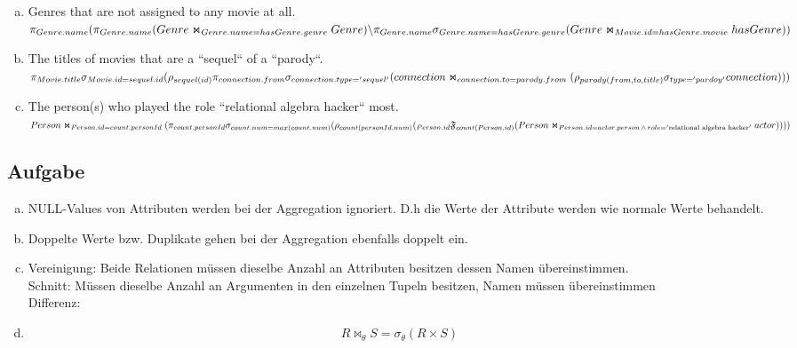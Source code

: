 \documentclass[11pt,a4paper,DIV=9]{scrartcl}
\newcounter{temp}
\newcommand{\aufgabe}[1]{
  \setcounter{temp}{\value{subsection}}
  \setcounter{subsection}{#1}
  \addtocounter{subsection}{-1}
  \subsection{Aufgabe}
  \setcounter{subsection}{\value{temp}}
}
\begin{document}
\begin{enumerate}[a)]
    \item Genres that are not assigned to any movie at all. \hfill \\
      $
      \pi _{Genre.name} \\
      (\pi _{Genre.name}(Genre \Join _{Genre.name = hasGenre.genre} Genre )\\
      \backslash
        \\
        \pi _{Genre.name} \sigma _{Genre.name = hasGenre.genre} (Genre \Join _{Movie.id = hasGenre.movie} hasGenre))
      $
    \item The titles of movies that are a ``sequel`` of a ``parody``. \\
      $\pi_{Movie.title} \\
      \sigma_{Movie.id = sequel.id} \\
      (\rho_{sequel(id)}\\
      \pi_{connection.from}\sigma_{connection.type='sequel'}\\
      (connection \Join_{connection.to = parody.from} \\ 
        (\rho_{parody(from,to,title)}\sigma_{type='pardoy'}connection)\\
      ))$
    \item The person(s) who played the role ``relational algebra hacker`` most.\hfill\\
      $
      Person \Join_{Person.id = count.personId}(\pi_{count.personId}\\
      \sigma_{count.num=max(count.num)}\\
      (
        \rho_{count(personId,num)} (\\
          _{Person.id}\mathfrak{F}_{count(Person.id)}(\\
          Person\Join_{Person.id = actor.person \,\wedge\, role = '\textrm{relational algebra hacker}'}actor\\
          )\\
        )\\
      ))
      $
  \end{enumerate}
\aufgabe{2}
 \begin{enumerate}[a)]
   \item NULL-Values von Attributen werden bei der Aggregation ignoriert. D.h die Werte der Attribute werden wie normale Werte behandelt.
   \item Doppelte Werte bzw. Duplikate gehen bei der Aggregation ebenfalls doppelt ein.
   \item Vereinigung: Beide Relationen m\"ussen dieselbe Anzahl an Attributen besitzen dessen Namen \"ubereinstimmen. 
   \\ Schnitt: M\"ussen dieselbe Anzahl an Argumenten in den einzelnen Tupeln besitzen, Namen m\"ussen \"ubereinstimmen
   \\ Differenz: 

   \item \begin{displaymath} R \Join _{\theta} S =  \sigma _{\theta} (R \times S) \end{displaymath}
 \end{enumerate}
\end{document}
